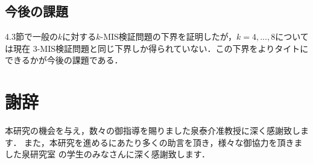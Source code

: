 \documentclass[12pt]{thesis}
\theoremstyle{definition}
\begin{document}
\section{今後の課題}
4.3節で一般の$k$に対する$k$-MIS検証問題の下界を証明したが，$k = 4,...,8$については現在
3-MIS検証問題と同じ下界しか得られていない．この下界をよりタイトにできるかが今後の課題である．
\newpage

\chapter*{謝辞}
本研究の機会を与え，数々の御指導を賜りました泉泰介准教授に深く感謝致します．
また，本研究を進めるにあたり多くの助言を頂き，様々な御協力を頂きました泉研究室
の学生のみなさんに深く感謝致します．

\newpage


\end{document}
